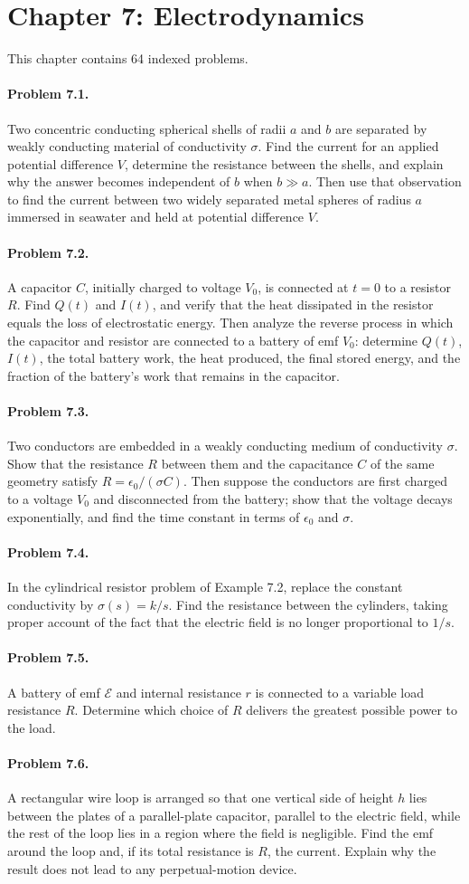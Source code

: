 \documentclass{aa}
\newcommand{\problemstatement}[2]{%
\paragraph{Problem #1.}#2\par\medskip
}
\begin{document}
\section{Chapter 7: Electrodynamics}
This chapter contains 64 indexed problems.

\problemstatement{7.1}{Two concentric conducting spherical shells of radii \(a\) and \(b\) are separated by weakly conducting material of conductivity \(\sigma\). Find the current for an applied potential difference \(V\), determine the resistance between the shells, and explain why the answer becomes independent of \(b\) when \(b\gg a\). Then use that observation to find the current between two widely separated metal spheres of radius \(a\) immersed in seawater and held at potential difference \(V\).}
\problemstatement{7.2}{A capacitor \(C\), initially charged to voltage \(V_0\), is connected at \(t=0\) to a resistor \(R\). Find \(Q(t)\) and \(I(t)\), and verify that the heat dissipated in the resistor equals the loss of electrostatic energy. Then analyze the reverse process in which the capacitor and resistor are connected to a battery of emf \(V_0\): determine \(Q(t)\), \(I(t)\), the total battery work, the heat produced, the final stored energy, and the fraction of the battery's work that remains in the capacitor.}
\problemstatement{7.3}{Two conductors are embedded in a weakly conducting medium of conductivity \(\sigma\). Show that the resistance \(R\) between them and the capacitance \(C\) of the same geometry satisfy \(R=\epsilon_0/(\sigma C)\). Then suppose the conductors are first charged to a voltage \(V_0\) and disconnected from the battery; show that the voltage decays exponentially, and find the time constant in terms of \(\epsilon_0\) and \(\sigma\).}
\problemstatement{7.4}{In the cylindrical resistor problem of Example 7.2, replace the constant conductivity by \(\sigma(s)=k/s\). Find the resistance between the cylinders, taking proper account of the fact that the electric field is no longer proportional to \(1/s\).}
\problemstatement{7.5}{A battery of emf \(\mathcal{E}\) and internal resistance \(r\) is connected to a variable load resistance \(R\). Determine which choice of \(R\) delivers the greatest possible power to the load.}
\problemstatement{7.6}{A rectangular wire loop is arranged so that one vertical side of height \(h\) lies between the plates of a parallel-plate capacitor, parallel to the electric field, while the rest of the loop lies in a region where the field is negligible. Find the emf around the loop and, if its total resistance is \(R\), the current. Explain why the result does not lead to any perpetual-motion device.}
\end{document}
